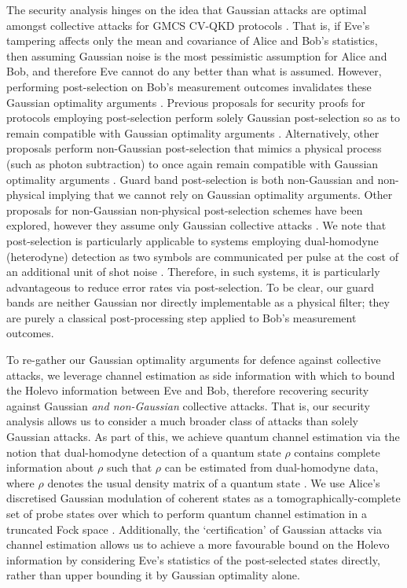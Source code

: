 ﻿\documentclass[12pt]{article}
\begin{document}
The security analysis hinges on the idea that Gaussian attacks are optimal amongst collective attacks for GMCS CV-QKD protocols \cite{Garcia-Patron-2006, Navascues-2006, Leverrier-2010a}. That is, if Eve's tampering affects only the mean and covariance of Alice and Bob's statistics, then assuming Gaussian noise is the most pessimistic assumption for Alice and Bob, and therefore Eve cannot do any better than what is assumed. However, performing post-selection on Bob's measurement outcomes invalidates these Gaussian optimality arguments \cite{Diamanti-2015, Usenko-2025, Leverrier-2008}. Previous proposals for security proofs for protocols employing post-selection perform solely Gaussian post-selection so as to remain compatible with Gaussian optimality arguments \cite{Fiurasek-2012, Walk-2013, Hosseinidehaj-2020}. Alternatively, other proposals perform non-Gaussian post-selection that mimics a physical process (such as photon subtraction) to once again remain compatible with Gaussian optimality arguments \cite{Li-2016, Hu-2020}. Guard band post-selection is both non-Gaussian and non-physical implying that we cannot rely on Gaussian optimality arguments. Other proposals for non-Gaussian non-physical post-selection schemes have been explored, however they assume only Gaussian collective attacks \cite{Heid-2007, Erkilic-2025a}. We note that post-selection is particularly applicable to systems employing dual-homodyne (heterodyne) detection as two symbols are communicated per pulse at the cost of an additional unit of shot noise \cite{Weerasinghe-2023, Laudenbach-2018}. Therefore, in such systems, it is particularly advantageous to reduce error rates via post-selection. To be clear, our guard bands are neither Gaussian nor directly implementable as a physical filter; they are purely a classical post-processing step applied to Bob's measurement outcomes.

To re-gather our Gaussian optimality arguments for defence against collective attacks, we leverage channel estimation as side information with which to bound the Holevo information between Eve and Bob, therefore recovering security against Gaussian \textit{and non-Gaussian} collective attacks. That is, our security analysis allows us to consider a much broader class of attacks than solely Gaussian attacks. As part of this, we achieve quantum channel estimation via the notion that dual-homodyne detection of a quantum state $\rho$ contains complete information about $\rho$ such that $\rho$ can be estimated from dual-homodyne data, where $\rho$ denotes the usual density matrix of a quantum state \cite{Leonhardt-1995}. We use Alice's discretised Gaussian modulation of coherent states as a tomographically-complete set of probe states over which to perform quantum channel estimation in a truncated Fock space \cite{Lobino-2008, Rahimi-Keshari-2011}. Additionally, the `certification' of Gaussian attacks via channel estimation allows us to achieve a more favourable bound on the Holevo information by considering Eve's statistics of the post-selected states directly, rather than upper bounding it by Gaussian optimality alone. 
\end{document}
